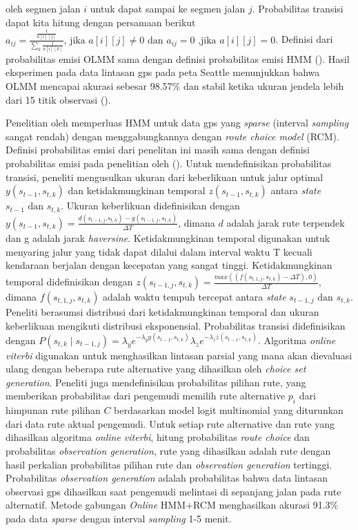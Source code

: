 oleh segmen jalan $i$ untuk dapat sampai ke segmen jalan $j$. Probabilitas transisi dapat kita hitung dengan persamaan berikut $a_{ij}=\frac{\frac{1}{a[i][j]}}{\sum_{k}\frac{1}{a[i][k]}} \text{, jika } a[i][j] \neq 0 \text{ dan } a_{ij}=0 \text{ ,jika } a[i][j] = 0$. Definisi dari probabilitas emisi OLMM sama dengan definisi probabilitas emisi HMM (\cite{Krumm2009}). Hasil eksperimen pada data lintasan gps pada peta Seattle menunjukkan bahwa OLMM mencapai akurasi sebesar 98.57\% dan stabil ketika ukuran jendela lebih dari 15 titik observasi (\cite{Liang2016}).


Penelitian oleh \cite{Jagadeesh2017} memperluas HMM untuk data gps yang \textit{sparse} (interval \textit{sampling} sangat rendah) dengan menggabungkannya dengan \textit{route choice model} (RCM). Definisi probabilitas emisi dari penelitan ini masih sama dengan definisi probabilitas emisi pada penelitian oleh (\cite{Krumm2009}). Untuk mendefinisikan probabilitas transisi, peneliti mengusulkan ukuran dari keberlikuan untuk jalur optimal $y(s_{t-1}, s_{t,k})$ dan ketidakmungkinan temporal $z(s_{t-1}, s_{t,k})$ antara \textit{state} $s_{t-1} \text{ dan } s_{t,k}$. Ukuran keberlikuan didefinisikan dengan $y(s_{t-1}, s_{t,k})=\frac{d(s_{t-1,j}. s_{t,k})-g(s_{t-1,j},s_{t,k})}{\Delta T}$, dimana $d$ adalah jarak rute terpendek dan g adalah jarak \textit{haversine}. Ketidakmungkinan temporal digunakan untuk menyaring  jalur yang tidak dapat dilalui dalam interval waktu T kecuali kendaraan berjalan dengan kecepatan yang sangat tinggi. Ketidakmungkinan temporal didefinisikan dengan $z(s_{t-1,j}, s_{t,k})=\frac{max((f(s_{t,1,j}, s_{t,k}) - \Delta T), 0)}{\Delta T}$, dimana $f(s_{t,1,j}, s_{t,k}) $ adalah waktu tempuh tercepat antara \textit{state} $s_{t-1,j} \text{ dan } s_{t,k}$. Peneliti berasumsi distribusi dari ketidakmungkinan temporal dan ukuran keberlikuan mengikuti distribusi eksponensial. Probabilitas transisi didefinisikan dengan $P(s_{t,k}\mid s_{t-1,j})=\lambda_y e^{-\lambda_y y(s_{t-1}, s_{t,k})} \lambda_z e^{-\lambda_z z(s_{t-1}, s_{t,k})}$. Algoritma \textit{online viterbi} digunakan untuk menghasilkan lintasan parsial yang mana akan dievaluasi ulang dengan beberapa rute alternative yang dihasilkan oleh \textit{choice set generation}. Peneliti juga mendefinisikan probabilitas pilihan rute, yang memberikan probabilitas dari pengemudi memilih rute alternative $p_i$ dari himpunan rute pilihan $C$ berdasarkan model logit multinomial yang diturunkan dari data rute aktual pengemudi. Untuk setiap rute alternative dan rute yang dihasilkan algoritma \textit{online viterbi}, hitung probabilitas \textit{route choice} dan probabilitas \textit{observation generation}, rute yang dihasilkan adalah rute dengan hasil perkalian probabilitas pilihan rute dan \textit{observation generation} tertinggi. Probabilitas \textit{observation generation} adalah probabilitas bahwa data lintasan observasi gps dihasilkan saat pengemudi melintasi di sepanjang jalan pada rute alternatif. Metode gabungan \textit{Online} HMM+RCM menghasilkan akurasi 91.3\% pada data \textit{sparse} dengan interval \textit{sampling} 1-5 menit.

